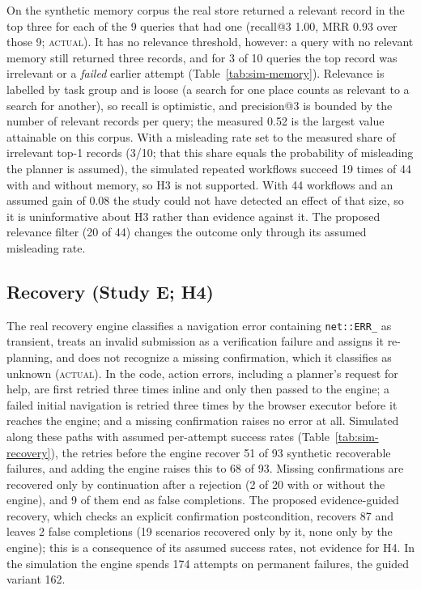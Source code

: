On the synthetic memory corpus the real store returned a relevant record in the top three for each of the 9 queries that had one (recall@3 1.00, MRR 0.93 over those 9; \textsc{actual}). It has no relevance threshold, however: a query with no relevant memory still returned three records, and for 3 of 10 queries the top record was irrelevant or a \emph{failed} earlier attempt (Table~\ref{tab:sim-memory}). Relevance is labelled by task group and is loose (a search for one place counts as relevant to a search for another), so recall is optimistic, and precision@3 is bounded by the number of relevant records per query; the measured 0.52 is the largest value attainable on this corpus. With a misleading rate set to the measured share of irrelevant top-1 records (3/10; that this share equals the probability of misleading the planner is assumed), the simulated repeated workflows succeed 19 times of 44 with and without memory, so H3 is not supported. With 44 workflows and an assumed gain of 0.08 the study could not have detected an effect of that size, so it is uninformative about H3 rather than evidence against it. The proposed relevance filter (20 of 44) changes the outcome only through its assumed misleading rate.

\subsection{Recovery (Study E; H4)}



The real recovery engine classifies a navigation error containing \texttt{net::ERR\_} as transient, treats an invalid submission as a verification failure and assigns it re-planning, and does not recognize a missing confirmation, which it classifies as unknown (\textsc{actual}). In the code, action errors, including a planner's request for help, are first retried three times inline and only then passed to the engine; a failed initial navigation is retried three times by the browser executor before it reaches the engine; and a missing confirmation raises no error at all. Simulated along these paths with assumed per-attempt success rates (Table~\ref{tab:sim-recovery}), the retries before the engine recover 51 of 93 synthetic recoverable failures, and adding the engine raises this to 68 of 93. Missing confirmations are recovered only by continuation after a rejection (2 of 20 with or without the engine), and 9 of them end as false completions. The proposed evidence-guided recovery, which checks an explicit confirmation postcondition, recovers 87 and leaves 2 false completions (19 scenarios recovered only by it, none only by the engine); this is a consequence of its assumed success rates, not evidence for H4. In the simulation the engine spends 174 attempts on permanent failures, the guided variant 162.

